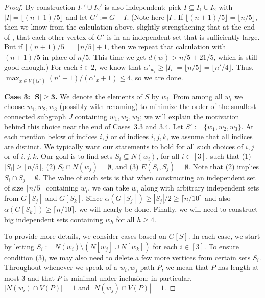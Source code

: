 \documentclass[10pt,a4paper]{amsart}
\newcommand\floor[1]{\lfloor#1\rfloor}
\renewcommand\ge\geqslant
\renewcommand\le\leqslant
\begin{document}
\begin{proof}
	By construction $I_1'\cup I_2'$ is also independent; 
	pick $I\subseteq I_1\cup I_2$ with $|I| = \floor{(n+1)/5}$ and let $G':= G-I$.  (Note here $|I|$.  If $\floor{(n+1)/5}=\floor{n/5}$, then we
	know from the calculation above, slightly strengthening that at the end of , 
	that each other vertex of $G'$ is in an independent set that is sufficiently large.  But if $\floor{(n+1)/5} = \floor{n/5}+1$, then we repeat
	that calculation with $(n+1)/5$ in place of $n/5$.  This time we get $d(w) > n/5+21/5$, which is still good enough.)
	For each $i\in 2$, we know that $\alpha'_{w_i}\ge |I_i| = \floor{n/5} = \floor{n'/4}$.  
Thus, $\max_{x\in V(G')}(n'+1)/(\alpha'_x+1)\le 4$, so we are done.


\textbf{Case 3: $\bm{|S|\ge 3}$.}
We denote the elements of $S$ by $w_i$.  From among all $w_i$ we choose $w_1,w_2,w_3$ (possibly with renaming) to minimize the order of the 
smallest connected subgraph $J$ containing $w_1,w_2,w_3$; we will explain the motivation behind this choice near the end of Cases~3.3 and 3.4.
%
Let $S':=\{w_1,w_2,w_3\}$.  At each mention below of indices $i,j$ or of indices $i,j,k$, we assume that all indices are distinct.
We typically want our statements to hold for all such choices of $i,j$ or of $i,j,k$.
Our goal is to find sets $S_i\subseteq N(w_i)$, for all $i\in [3]$, such that
(1) $|S_i|\ge \lceil n/5\rceil$, (2) $S_i \cap N(w_j) = \emptyset$, and 
(3) $E(S_i,S_j)=\emptyset$.  Note that (2) implies $S_i\cap S_j = \emptyset$.
The value of such sets is that when constructing an independent set of size $\lceil n/5\rceil$ containing $w_i$, we can take $w_i$ along with 
arbitrary independent sets from $G[S_j]$ and $G[S_k]$.  Since $\alpha(G[S_j])\ge |S_j|/2 \ge \lceil n/10\rceil$ and also $\alpha(G[S_k])\ge \lceil 
n/10\rceil$, we will nearly be done.  Finally, we will need to construct big independent sets containing $w_h$ for all $h\ge 4$.

To provide more details, we consider cases based on $G[S]$.
In each case, we start by letting $S_i:=N(w_i)\setminus (N[w_j]\cup N[w_k])$ for each $i\in [3]$.
To ensure condition (3), we may also need to delete a few more vertices from certain sets $S_i$.
Throughout whenever we speak of a $w_i,w_j$-path $P$, we mean that $P$ has length at most $3$ and that $P$ is minimal under inclusion; in particular,
	$|N(w_i)\cap V(P)|=1$ and $|N(w_j)\cap V(P)|=1$.


\end{proof}
\end{document}

